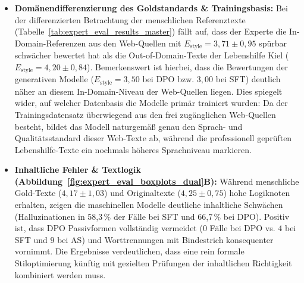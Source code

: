 \begin{itemize}
    \item \textbf{Domänendifferenzierung des Goldstandards \& Trainingsbasis:} Bei der differenzierten Betrachtung der menschlichen Referenztexte (Tabelle~\ref{tab:expert_eval_results_master}) fällt auf, dass der Experte die In-Domain-Referenzen aus den Web-Quellen mit $E_{\text{style}} = 3{,}71 \pm 0{,}95$ spürbar schwächer bewertet hat als die Out-of-Domain-Texte der Lebenshilfe Kiel ($E_{\text{style}} = 4{,}20 \pm 0{,}84$). Bemerkenswert ist hierbei, dass die Bewertungen der generativen Modelle ($E_{\text{style}} = 3{,}50$ bei DPO bzw. $3{,}00$ bei SFT) deutlich näher an diesem In-Domain-Niveau der Web-Quellen liegen. Dies spiegelt wider, auf welcher Datenbasis die Modelle primär trainiert wurden: Da der Trainingsdatensatz überwiegend aus den frei zugänglichen Web-Quellen besteht, bildet das Modell naturgemäß genau den Sprach- und Qualitätsstandard dieser Web-Texte ab, während die professionell geprüften Lebenshilfe-Texte ein nochmals höheres Sprachniveau markieren.
    \item \textbf{Inhaltliche Fehler \& Textlogik (Abbildung~\ref{fig:expert_eval_boxplots_dual}B):} Während menschliche Gold-Texte ($4{,}17 \pm 1{,}03$) und Originaltexte ($4{,}25 \pm 0{,}75$) hohe Logiknoten erhalten, zeigen die maschinellen Modelle deutliche inhaltliche Schwächen (Halluzinationen in 58{,}3\,\% der Fälle bei SFT und 66{,}7\,\% bei DPO). Positiv ist, dass DPO Passivformen vollständig vermeidet ($0$ Fälle bei DPO vs. $4$ bei SFT und $9$ bei AS) und Worttrennungen mit Bindestrich konsequenter vornimmt. Die Ergebnisse verdeutlichen, dass eine rein formale Stiloptimierung künftig mit gezielten Prüfungen der inhaltlichen Richtigkeit kombiniert werden muss.
\end{itemize}
